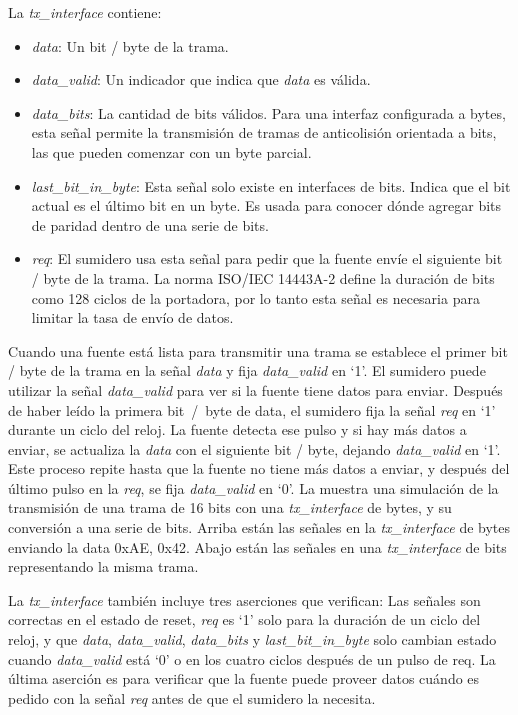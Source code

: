 \documentclass[a4paper, twoside, 11pt]{report}
\begin{document}
\FloatBarrier

La \textit{tx\_interface} contiene:

\begin{itemize}
  \item \textit{data}: Un bit / byte de la trama.
  \item \textit{data\_valid}: Un indicador que indica que \textit{data} es válida.
  \item \textit{data\_bits}: La cantidad de bits válidos. Para una interfaz configurada a bytes, esta señal permite la transmisión de tramas de anticolisión orientada a bits, las que pueden comenzar con un byte parcial.
  \item \textit{last\_bit\_in\_byte}: Esta señal solo existe en interfaces de bits. Indica que el bit actual es el último bit en un byte. Es usada para conocer dónde agregar bits de paridad dentro de una serie de bits.
  \item \textit{req}: El sumidero usa esta señal para pedir que la fuente envíe el siguiente bit / byte de la trama. La norma ISO/IEC 14443A-2 define la duración de bits como 128 ciclos de la portadora, por lo tanto esta señal es necesaria para limitar la tasa de envío de datos.
\end{itemize}

Cuando una fuente está lista para transmitir una trama se establece el primer bit / byte de la trama en la señal \textit{data} y fija \textit{data\_valid} en ‘1’. El sumidero puede utilizar la señal \textit{data\_valid} para ver si la fuente tiene datos para enviar. Después de haber leído la primera bit~/~byte de data, el sumidero fija la señal \textit{req} en ‘1’ durante un ciclo del reloj. La fuente detecta ese pulso y si hay más datos a enviar, se actualiza la \textit{data} con el siguiente bit / byte, dejando \textit{data\_valid} en ‘1’. Este proceso repite hasta que la fuente no tiene más datos a enviar, y después del último pulso en la \textit{req}, se fija \textit{data\_valid} en ‘0’. La  muestra una simulación de la transmisión de una trama de 16 bits con una \textit{tx\_interface} de bytes, y su conversión a una serie de bits. Arriba están las señales en la \textit{tx\_interface} de bytes enviando la data 0xAE, 0x42. Abajo están las señales en una \textit{tx\_interface} de bits representando la misma trama.

La \textit{tx\_interface} también incluye tres aserciones que verifican: Las señales son correctas en el estado de reset, \textit{req} es ‘1’ solo para la duración de un ciclo del reloj, y que \textit{data}, \textit{data\_valid}, \textit{data\_bits} y \textit{last\_bit\_in\_byte} solo cambian estado cuando \textit{data\_valid} está ‘0’ o en los cuatro ciclos después de un pulso de req. La última aserción es para verificar que la fuente puede proveer datos cuándo es pedido con la señal \textit{req} antes de que el sumidero la necesita.
\end{document}
